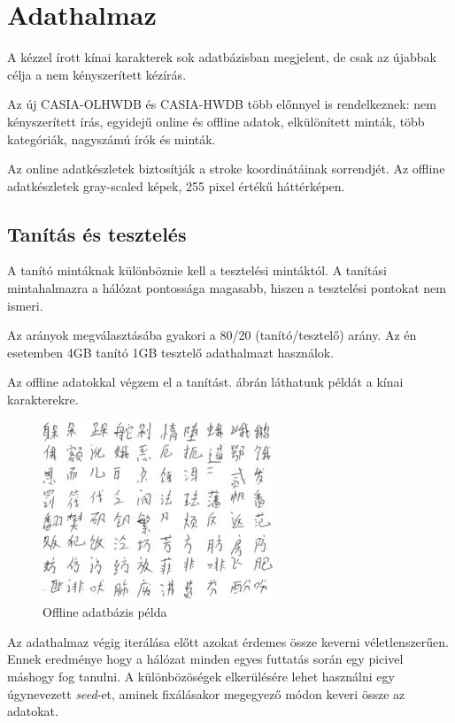 
\section{Adathalmaz}

A kézzel írott kínai karakterek sok adatbázisban megjelent, de csak az újabbak célja a nem kényszerített kézírás.

Az új CASIA-OLHWDB és CASIA-HWDB több előnnyel is rendelkeznek: nem kényszerített írás, egyidejű online és offline adatok, elkülönített minták, több kategóriák, nagyszámú írók és minták.

Az online adatkészletek biztosítják a stroke koordinátáinak sorrendjét. Az offline adatkészletek gray-scaled képek, 255 pixel értékű háttérképen.

\subsection{Tanítás és tesztelés}

A tanító mintáknak különböznie kell a tesztelési mintáktól. A tanítási mintahalmazra a hálózat pontossága magasabb, hiszen a tesztelési pontokat nem ismeri.

Az arányok megválasztásába gyakori a 80/20 (tanító/tesztelő) arány. Az én esetemben 4GB tanító 1GB tesztelő adathalmazt használok.

Az offline adatokkal végzem el a tanítást. ábrán láthatunk példát a kínai karakterekre.

\begin{figure}[h]
	\centering
	\includegraphics[scale=1.0]{images/offline_dataset}
	\caption{Offline adatbázis példa}
	\label{fig:offline_dataset}
\end{figure} 

Az adathalmaz végig iterálása előtt azokat érdemes össze keverni véletlenszerűen. Ennek eredménye hogy a hálózat minden egyes futtatás során egy picivel máshogy fog tanulni. A különbözöségek elkerülésére lehet használni egy úgynevezett \textit{seed}-et, aminek fixálásakor megegyező módon keveri össze az adatokat.


